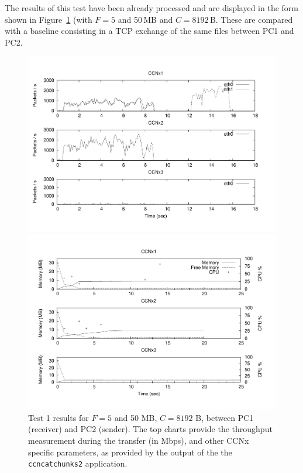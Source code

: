 The results of this test have been already processed and are displayed in the 
form shown in Figure~\ref{fig:test1} (with $F = 5$ and 50\,MB and $C = 8192$\,B. 
These are compared with a baseline consisting in a TCP exchange of the same 
files between PC1 and PC2.\vertbreak

\begin{figure}[h!]
\begin{minipage}[b]{0.5\textwidth}
    \centering
    \includegraphics[width=\textwidth]{figures/long-short-route-net.pdf}
    \caption{\footnotesize Test 1 results for $F = 5$ MB, $C = 8192$ B.}
    \label{fig:subfig1}
\end{minipage}
\hspace{0.10cm}
\begin{minipage}[b]{0.5\textwidth}
\centering
    \includegraphics[width=\textwidth]{figures/file_5-long-short-route-cpu-mem.pdf}
    \caption{\footnotesize Test 1 results for $F = 50$ MB, $C = 8192$ B.}
    \label{fig:subfig2}
\end{minipage}
\cprotect\caption{Test 1 results for $F = 5$ and 50 MB, $C = 8192$ B, between 
        PC1 (receiver) and PC2 (sender). The top 
        charts provide the throughput measurement during the transfer (in Mbps), 
        and other CCNx specific parameters, as provided by the output of the 
        the \verb+ccncatchunks2+ application.}
\label{fig:test1}
\end{figure}

